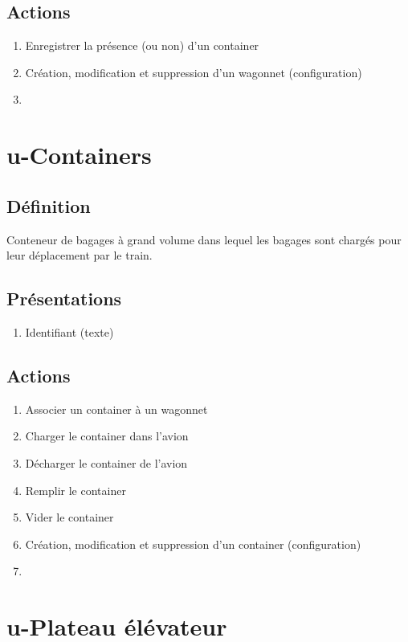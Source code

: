 \subsection{Actions}
\begin{enumerate}
	\item Enregistrer la présence (ou non) d'un container
	\item Création, modification et suppression d'un wagonnet (configuration)
	\item \etat
\end{enumerate}

\section{u-Containers}
\subsection{Définition}
	Conteneur de bagages à grand volume dans lequel les bagages sont chargés pour leur déplacement par le train.

\subsection{Présentations}
\begin{enumerate}
	\item Identifiant (texte)
\end{enumerate}

\subsection{Actions}
\begin{enumerate}
	\item Associer un container à un wagonnet
	\item Charger le container dans l'avion
	\item Décharger le container de l'avion
	\item Remplir le container
	\item Vider le container
	\item Création, modification et suppression d'un container (configuration)
	\item \etat
\end{enumerate}

\section{u-Plateau élévateur}

